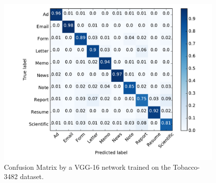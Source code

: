\begin{figure}
        \centering
        \includegraphics[width=\linewidth]{confusion_vgg.pdf}
        \caption{Confusion Matrix by a VGG-16 network trained on the Tobacco-3482 dataset.}
\label{fig:confusion}
\end{figure}
